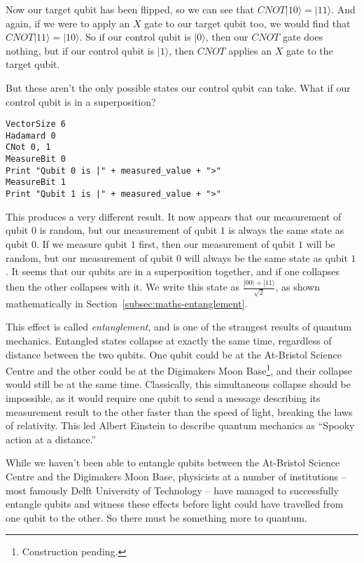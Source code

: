 \documentclass[twocolumn]{article}
\begin{document}
Now our target qubit has been flipped, so we can see that $CNOT|10\rangle = |11\rangle$. And again, if we were to apply an $X$ gate to our target qubit too, we would find that $CNOT|11\rangle = |10\rangle$. So if our control qubit is $|0\rangle$, then our $CNOT$ gate does nothing, but if our control qubit is $|1\rangle$, then $CNOT$ applies an $X$ gate to the target qubit.

But these aren't the only possible states our control qubit can take. What if our control qubit is in a superposition?

\begin{lstlisting}
VectorSize 6
Hadamard 0
CNot 0, 1
MeasureBit 0
Print "Qubit 0 is |" + measured_value + ">"
MeasureBit 1
Print "Qubit 1 is |" + measured_value + ">"
\end{lstlisting}

This produces a very different result. It now appears that our measurement of qubit $0$ is random, but our measurement of qubit $1$ is always the same state as qubit $0$. If we measure qubit $1$ first, then our measurement of qubit $1$ will be random, but our measurement of qubit $0$ will always be the same state as qubit $1$. It seems that our qubits are in a superposition together, and if one collapses then the other collapses with it. We write this state as $\frac{|00\rangle + |11\rangle}{\sqrt{2}}$, as shown mathematically in Section~\ref{subsec:maths-entanglement}.

This effect is called {\em entanglement}, and is one of the strangest results of quantum mechanics. Entangled states collapse at exactly the same time, regardless of distance between the two qubits. One qubit could be at the At-Bristol Science Centre and the other could be at the Digimakers Moon Base\footnote{Construction pending.}, and their collapse would still be at the same time. Classically, this simultaneous collapse should be impossible, as it would require one qubit to send a message describing its measurement result to the other faster than the speed of light, breaking the laws of relativity. This led Albert Einstein to describe quantum mechanics as ``Spooky action at a distance.''

While we haven't been able to entangle qubits between the At-Bristol Science Centre and the Digimakers Moon Base, physicists at a number of institutions -- most famously Delft University of Technology -- have managed to successfully entangle qubits and witness these effects before light could have travelled from one qubit to the other. So there must be something more to quantum.
\end{document}
